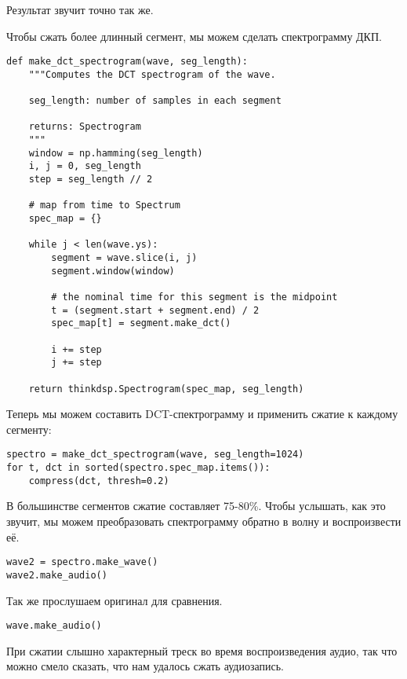 \documentclass[a4paper,12pt]{report}
\begin{document}
Результат звучит точно так же.

Чтобы сжать более длинный сегмент, мы можем сделать спектрограмму ДКП. 

\begin{lstlisting}[caption=Функция \texttt{make\_dct\_spectrogram}]
def make_dct_spectrogram(wave, seg_length):
    """Computes the DCT spectrogram of the wave.

    seg_length: number of samples in each segment

    returns: Spectrogram
    """
    window = np.hamming(seg_length)
    i, j = 0, seg_length
    step = seg_length // 2

    # map from time to Spectrum
    spec_map = {}

    while j < len(wave.ys):
        segment = wave.slice(i, j)
        segment.window(window)

        # the nominal time for this segment is the midpoint
        t = (segment.start + segment.end) / 2
        spec_map[t] = segment.make_dct()

        i += step
        j += step

    return thinkdsp.Spectrogram(spec_map, seg_length)
\end{lstlisting}

Теперь мы можем составить DCT-спектрограмму и применить сжатие к каждому сегменту:

\begin{lstlisting}[caption=Сжатие звука]
spectro = make_dct_spectrogram(wave, seg_length=1024)
for t, dct in sorted(spectro.spec_map.items()):
    compress(dct, thresh=0.2)
\end{lstlisting}

В большинстве сегментов сжатие составляет 75-80\%. Чтобы услышать, как это звучит, мы можем преобразовать спектрограмму обратно в волну и воспроизвести её.

\begin{lstlisting}[caption=Воспроизведение сжатого звука]
wave2 = spectro.make_wave()
wave2.make_audio()
\end{lstlisting}

Так же прослушаем оригинал для сравнения.

\begin{lstlisting}[caption=Воспроизведение оригинального звука]
wave.make_audio()
\end{lstlisting}

При сжатии слышно характерный треск во время воспроизведения аудио, так что можно смело сказать, что нам удалось сжать аудиозапись.
\end{document}
